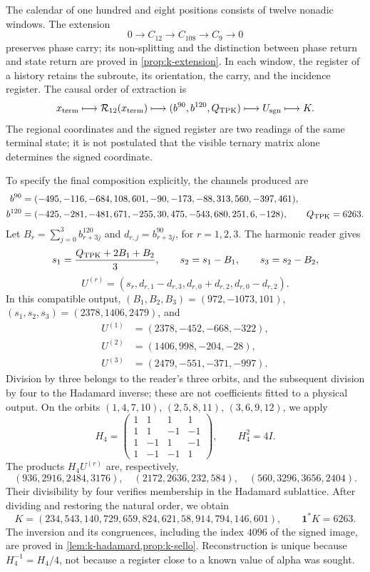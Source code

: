 The calendar of one hundred and eight positions consists of twelve nonadic windows. The extension
\[
 0\longrightarrow C_{12}\longrightarrow C_{108}
 \longrightarrow C_9\longrightarrow0
\]
preserves phase carry; its non-splitting and the distinction between phase return and state return are proved in \cref{prop:k-extension}. In each window, the register of a history retains the subroute, its orientation, the carry, and the incidence register. The causal order of extraction is
\begin{equation}
 x_{\rm term}\longmapsto\mathcal R_{12}(x_{\rm term})
 \longmapsto(b^{90},b^{120},Q_{\rm TPK})
 \longmapsto U_{\rm sgn}\longmapsto K.
 \label{lib01:cadena-registro}
\end{equation}
The regional coordinates and the signed register are two readings of the same terminal state; it is not postulated that the visible ternary matrix alone determines the signed coordinate.

To specify the final composition explicitly, the channels produced are
\begin{align*}
 b^{90}&=(-495,-116,-684,108,601,-90,
                -173,-88,313,560,-397,461),\\
 b^{120}&=(-425,-281,-481,671,-255,30,
                 475,-543,680,251,6,-128),\qquad Q_{\rm TPK}=6263.
\end{align*}
Let \(B_r=\sum_{j=0}^3b^{120}_{r+3j}\) and \(d_{r,j}=b^{90}_{r+3j}\), for \(r=1,2,3\). The harmonic reader gives
\[
 s_1=\frac{Q_{\rm TPK}+2B_1+B_2}{3},\qquad
 s_2=s_1-B_1,\qquad s_3=s_2-B_2,
\]
\[
 U^{(r)}=(s_r,d_{r,1}-d_{r,3},d_{r,0}+d_{r,2},d_{r,0}-d_{r,2}).
\]
In this compatible output, \((B_1,B_2,B_3)=(972,-1073,101)\), \((s_1,s_2,s_3)=(2378,1406,2479)\), and
\begin{align*}
 U^{(1)}&=(2378,-452,-668,-322),\\
 U^{(2)}&=(1406,998,-204,-28),\\
 U^{(3)}&=(2479,-551,-371,-997).
\end{align*}
Division by three belongs to the reader's three orbits, and the subsequent division by four to the Hadamard inverse; these are not coefficients fitted to a physical output. On the orbits \((1,4,7,10)\), \((2,5,8,11)\), \((3,6,9,12)\), we apply
\[
 H_4=\begin{pmatrix}
 1&1&1&1\\1&1&-1&-1\\1&-1&1&-1\\1&-1&-1&1
 \end{pmatrix},\qquad H_4^2=4I.
\]
The products \(H_4U^{(r)}\) are, respectively,
\[
 (936,2916,2484,3176),\quad(2172,2636,232,584),
 \quad(560,3296,3656,2404).
\]
Their divisibility by four verifies membership in the Hadamard sublattice. After dividing and restoring the natural order, we obtain
\begin{equation}
 K=(234,543,140,729,659,824,621,58,914,794,146,601),
 \qquad\mathbf1^*K=6263.
 \label{lib01:K}
\end{equation}
The inversion and its congruences, including the index \(4096\) of the signed image, are proved in \cref{lem:k-hadamard,prop:k-sello}. Reconstruction is unique because \(H_4^{-1}=H_4/4\), not because a register close to a known value of alpha was sought.

